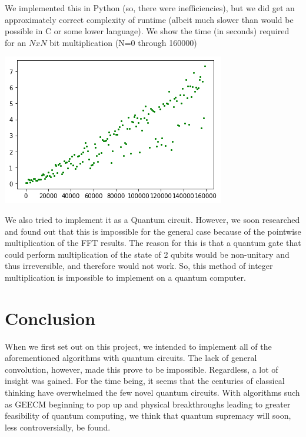 \documentclass[a4paper,11pt]{article}
\theoremstyle{mytheor}
\begin{document}
We implemented this in Python (so, there were inefficiencies), but we did get an approximately correct complexity of runtime (albeit much slower than would be possible in C or some lower language). We show the time (in seconds) required for an $NxN$ bit multiplication (N=0 through 160000)

\includegraphics{intMM_time}

We also tried to implement it as a Quantum circuit. However, we soon researched and found out that this is impossible for the general case \cite{qconv} because of the pointwise multiplication of the FFT results. The reason for this is that a quantum gate that could perform multiplication of the state of 2 qubits would be non-unitary and thus irreversible, and therefore would not work. So, this method of integer multiplication is impossible to implement on a quantum computer.



\section{Conclusion}
When we first set out on this project, we intended to implement all of the aforementioned algorithms with quantum circuits. The lack of general convolution, however, made this prove to be impossible. Regardless, a lot of insight was gained. For the time being, it seems that the centuries of classical thinking have overwhelmed the few novel quantum circuits. With algorithms such as GEECM beginning to pop up and physical breakthroughs leading to greater feasibility of quantum computing, we think that quantum supremacy will soon, less controversially, be found.
\end{document}
